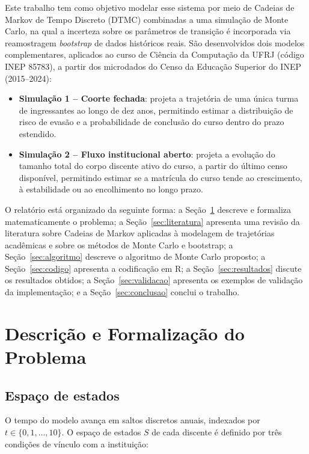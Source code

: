 \documentclass[12pt,times,article,chapter=TITLE]{abnt}
\begin{document}
Este trabalho tem como objetivo modelar esse sistema por meio de Cadeias de Markov de Tempo Discreto (DTMC) combinadas a uma simulação de Monte Carlo, na qual a incerteza sobre os parâmetros de transição é incorporada via reamostragem \textit{bootstrap} de dados históricos reais. São desenvolvidos dois modelos complementares, aplicados ao curso de Ciência da Computação da UFRJ (código INEP 85783), a partir dos microdados do Censo da Educação Superior do INEP (2015--2024):

\begin{itemize}
  \item \textbf{Simulação 1 -- Coorte fechada}: projeta a trajetória de uma única turma de ingressantes ao longo de dez anos, permitindo estimar a distribuição de risco de evasão e a probabilidade de conclusão do curso dentro do prazo estendido.
  \item \textbf{Simulação 2 -- Fluxo institucional aberto}: projeta a evolução do tamanho total do corpo discente ativo do curso, a partir do último censo disponível, permitindo estimar se a matrícula do curso tende ao crescimento, à estabilidade ou ao encolhimento no longo prazo.
\end{itemize}

O relatório está organizado da seguinte forma: a Seção~\ref{sec:formalizacao} descreve e formaliza matematicamente o problema; a Seção~\ref{sec:literatura} apresenta uma revisão da literatura sobre Cadeias de Markov aplicadas à modelagem de trajetórias acadêmicas e sobre os métodos de Monte Carlo e bootstrap; a Seção~\ref{sec:algoritmo} descreve o algoritmo de Monte Carlo proposto; a Seção~\ref{sec:codigo} apresenta a codificação em R; a Seção~\ref{sec:resultados} discute os resultados obtidos; a Seção~\ref{sec:validacao} apresenta os exemplos de validação da implementação; e a Seção~\ref{sec:conclusao} conclui o trabalho.


\chapter{Descrição e Formalização do Problema}
\label{sec:formalizacao}

\section{Espaço de estados}

O tempo do modelo avança em saltos discretos anuais, indexados por $t \in \{0, 1, \dots, 10\}$. O espaço de estados $S$ de cada discente é definido por três condições de vínculo com a instituição:
\end{document}
